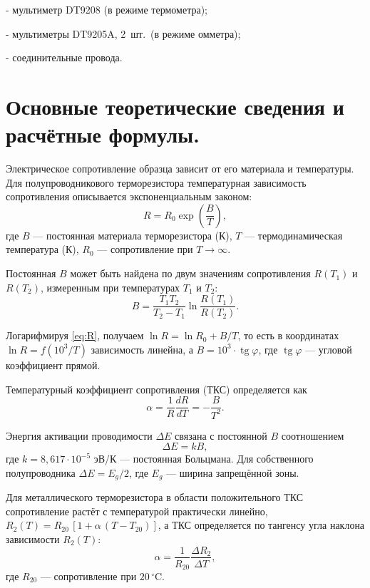\documentclass[12pt, a4paper]{article}
\begin{document}
	- мультиметр DT9208 (в режиме термометра);
	
	- мультиметры DT9205A, 2~шт.\ (в режиме омметра);
	
	- соединительные провода.
	
	\section{Основные теоретические сведения и расчётные формулы.}
	Электрическое сопротивление образца зависит от его материала и температуры. Для полупроводникового терморезистора температурная зависимость сопротивления описывается экспоненциальным законом:
	\begin{equation}
		R = R_0 \exp\!\left(\frac{B}{T}\right),
		\label{eq:R}
	\end{equation}
	где $B$ --- постоянная материала терморезистора (К), $T$ --- термодинамическая температура (К), $R_0$ --- сопротивление при $T \to \infty$.
	
	Постоянная $B$ может быть найдена по двум значениям сопротивления $R(T_1)$ и $R(T_2)$, измеренным при температурах $T_1$ и $T_2$:
	\begin{equation}
		B = \frac{T_1 T_2}{T_2 - T_1} \ln \frac{R(T_1)}{R(T_2)}.
		\label{eq:B}
	\end{equation}
	
	Логарифмируя \eqref{eq:R}, получаем $\ln R = \ln R_0 + B/T$, то есть в координатах $\ln R = f(10^3/T)$ зависимость линейна, а $B = 10^3 \cdot \operatorname{tg}\varphi$, где $\operatorname{tg}\varphi$ --- угловой коэффициент прямой.
	
	Температурный коэффициент сопротивления (ТКС) определяется как
	\begin{equation}
		\alpha = \frac{1}{R}\frac{dR}{dT} = -\frac{B}{T^2}.
		\label{eq:alpha}
	\end{equation}
	
	Энергия активации проводимости $\Delta E$ связана с постоянной $B$ соотношением
	\begin{equation}
		\Delta E = kB,
		\label{eq:dE}
	\end{equation}
	где $k = 8{,}617 \cdot 10^{-5}$ эВ/К --- постоянная Больцмана. Для собственного полупроводника $\Delta E = E_g/2$, где $E_g$ --- ширина запрещённой зоны.
	
	Для металлического терморезистора в области положительного ТКС сопротивление растёт с температурой практически линейно, $R_2(T) = R_{20}\,[1 + \alpha\,(T - T_{20})]$, а ТКС определяется по тангенсу угла наклона зависимости $R_2(T)$:
	\begin{equation}
		\alpha = \frac{1}{R_{20}}\frac{\Delta R_2}{\Delta T},
		\label{eq:alphaM}
	\end{equation}
	где $R_{20}$ --- сопротивление при $20\,^\circ$C.
	
\end{document}
